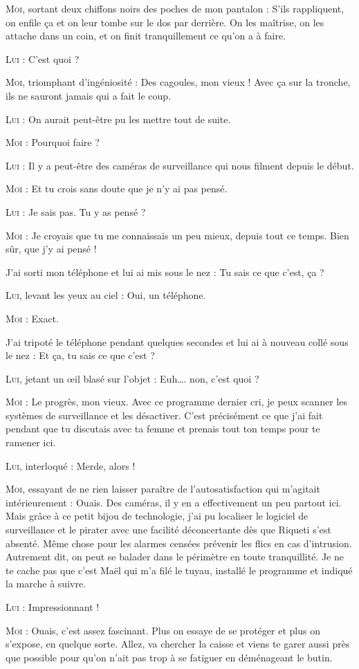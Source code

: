 \begin{dialogue}

\textsc{Moi}, sortant deux chiffons noirs des poches de mon pantalon : S’ils rappliquent, on enfile ça et on leur tombe sur le dos par derrière. On les maîtrise, on les attache dans un coin, et on finit tranquillement ce qu’on a à faire.

\textsc{Lui} : C’est quoi ?

\textsc{Moi}, triomphant d’ingéniosité : Des cagoules, mon vieux ! Avec ça sur la tronche, ils ne sauront jamais qui a fait le coup.

\textsc{Lui} : On aurait peut-être pu les mettre tout de suite.

\textsc{Moi} : Pourquoi faire ?

\textsc{Lui} : Il y a peut-être des caméras de surveillance qui nous filment depuis le début.

\textsc{Moi} : Et tu crois sans doute que je n’y ai pas pensé.

\textsc{Lui} : Je sais pas. Tu y as pensé ?

\textsc{Moi} : Je croyais que tu me connaissais un peu mieux, depuis tout ce temps. Bien sûr, que j’y ai pensé !

J’ai sorti mon téléphone et lui ai mis sous le nez : Tu sais ce que c’est, ça ?

\textsc{Lui}, levant les yeux au ciel : Oui, un téléphone.

\textsc{Moi} : Exact.

J’ai tripoté le téléphone pendant quelques secondes et lui ai à nouveau collé sous le nez : Et ça, tu sais ce que c’est ?

\textsc{Lui}, jetant un œil blasé sur l’objet : Euh…. non, c’est quoi ?

\textsc{Moi} : Le progrès, mon vieux. Avec ce programme dernier cri, je peux scanner les systèmes de surveillance et les désactiver. C’est précisément ce que j’ai fait pendant que tu discutais avec ta femme et prenais tout ton temps pour te ramener ici.

\textsc{Lui}, interloqué : Merde, alors !

\textsc{Moi}, essayant de ne rien laisser paraître de l’autosatisfaction qui m’agitait intérieurement : Ouais. Des caméras, il y en a effectivement un peu partout ici. Mais grâce à ce petit bijou de technologie, j’ai pu localiser le logiciel de surveillance et le pirater avec une facilité déconcertante dès que Riqueti s’est absenté. Même chose pour les alarmes censées prévenir les flics en cas d’intrusion. Autrement dit, on peut se balader dans le périmètre en toute tranquillité. Je ne te cache pas que c’est Maël qui m’a filé le tuyau, installé le programme et indiqué la marche à suivre.

\textsc{Lui} : Impressionnant !

\textsc{Moi} : Ouais, c’est assez fascinant. Plus on essaye de se protéger et plus on s’expose, en quelque sorte. Allez, va chercher la caisse et viens te garer aussi près que possible pour qu’on n’ait pas trop à se fatiguer en déménageant le butin.

\end{dialogue}

